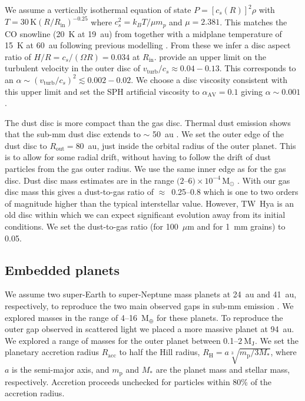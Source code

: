 \documentclass[usenatbib,a4paper,times]{mnras}
\renewcommand{\sun}{\mathrm{M}_{\odot}}
\renewcommand{\earth}{\mathrm{M}_{\oplus}}
\begin{document}
We assume a vertically isothermal equation of state $P={[c_s(R)]}^2\rho$ with $T
= 30\,\mathrm{K} {(R/R_{\mathrm{in}})}^{-0.25}$ where $c_s^2={k_B}T/\mu m_p$ and
$\mu=2.381$. This matches the CO snowline (20~K at 19~au) from
\citet{vant-hoff:2017} together with a midplane temperature of 15~K at 60~au
following previous modelling \citep{andrews:2012}. From these we infer a disc
aspect ratio of $H/R = c_s/(\Omega R) = 0.034$ at $R_{\mathrm{in}}$.
\citet{flaherty:2018} provide an upper limit on the turbulent velocity in the
outer disc of $v_{\mathrm{turb}}/c_s\approx 0.04-0.13$. This corresponds to an
$\alpha \sim {(v_{\mathrm{turb}}/c_s)}^2 \lesssim 0.002-0.02$. We choose a disc
viscosity \citep{shakura:1973} consistent with this upper limit and set the SPH
artificial viscosity to $\alpha_{\mathrm{AV}} = 0.1$ giving $\alpha \sim 0.001$.

The dust disc is more compact than the gas disc. Thermal dust emission shows
that the sub-mm dust disc extends to $\sim$ 50~au \citep{andrews:2016}. We set
the outer edge of the dust disc to $R_{\mathrm{out}}=80$~au, just inside the
orbital radius of the outer planet. This is to allow for some radial drift,
without having to follow the drift of dust particles from the gas outer radius.
We use the same inner edge as for the gas disc. Dust disc mass estimates are in
the range $(2$--$6)\times 10^{-4}\,\sun{}$ \citep{calvet:2002, thi:2010}. With
our gas disc mass this gives a dust-to-gas ratio of $\approx$~0.25--0.8 which is
one to two orders of magnitude higher than the typical interstellar value.
However, TW~Hya is an old disc within which we can expect significant evolution
away from its initial conditions. We set the dust-to-gas ratio (for 100~$\mu$m
and for 1~mm grains) to 0.05.





\subsection{Embedded planets}

We assume two super-Earth to super-Neptune mass planets at 24~au and 41~au,
respectively, to reproduce the two main observed gaps in sub-mm emission
\citep{andrews:2016}. We explored masses in the range of 4--16~$\earth{}$ for
these planets. To reproduce the outer gap observed in scattered light
\citep{van-boekel:2017} we placed a more massive planet at 94~au. We explored a
range of masses for the outer planet between 0.1--$2~\mathrm{M_J}$. We set the
planetary accretion radius $R_{\mathrm{acc}}$ to half the Hill radius,
$R_{\mathrm{H}} = a\sqrt[3]{m_{\mathrm{p}}/3M_*}$, where $a$ is the semi-major
axis, and $m_{\mathrm{p}}$ and $M_*$ are the planet mass and stellar mass,
respectively. Accretion proceeds unchecked for particles within 80\% of the
accretion radius.
\end{document}
